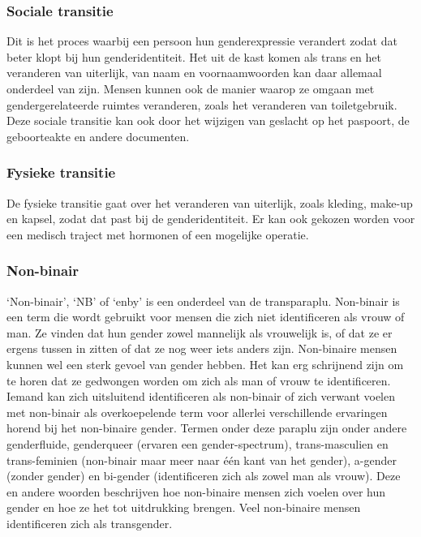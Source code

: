 \documentclass[12pt,openany]{book}
\begin{document}
\subsubsection*{Sociale transitie}

Dit is het proces waarbij een persoon hun genderexpressie verandert zodat dat beter klopt bij hun genderidentiteit. Het uit de kast komen als trans en het veranderen van uiterlijk, van naam en voornaamwoorden kan daar allemaal onderdeel van zijn. Mensen kunnen ook de manier waarop ze omgaan met gendergerelateerde ruimtes veranderen, zoals het veranderen van toiletgebruik. Deze sociale transitie kan ook door het wijzigen van geslacht op het paspoort, de geboorteakte en andere documenten.

\subsubsection*{Fysieke transitie}

De fysieke transitie gaat over het veranderen van uiterlijk, zoals kleding, make-up en kapsel, zodat dat past bij de genderidentiteit. Er kan ook gekozen worden voor een medisch traject met hormonen of een mogelijke operatie.  

\subsubsection*{Non-binair}

‘Non-binair’, ‘NB’ of ‘enby’ is een onderdeel van de transparaplu. Non-binair is een term die wordt gebruikt voor mensen die zich niet identificeren als vrouw of man. Ze vinden dat hun gender zowel mannelijk als vrouwelijk is, of dat ze er ergens tussen in zitten of dat ze nog weer iets anders zijn. Non-binaire mensen kunnen wel een sterk gevoel van gender hebben. Het kan erg schrijnend zijn om te horen dat ze gedwongen worden om zich als man of vrouw te identificeren. Iemand kan zich uitsluitend identificeren als non-binair of zich verwant voelen met non-binair als overkoepelende term voor allerlei verschillende ervaringen horend bij het non-binaire gender. Termen onder deze paraplu zijn onder andere genderfluide, genderqueer (ervaren een gender-spectrum), trans-masculien en trans-feminien (non-binair maar meer naar één kant van het gender), a-gender (zonder gender) en bi-gender (identificeren zich als zowel man als vrouw). Deze en andere woorden beschrijven hoe non-binaire mensen zich voelen over hun gender en hoe ze het tot uitdrukking brengen. Veel non-binaire mensen identificeren zich als transgender. 
\end{document}
